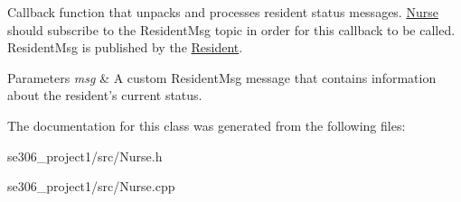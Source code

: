Callback function that unpacks and processes resident status messages. \hyperlink{classNurse}{Nurse} should subscribe to the Resident\-Msg topic in order for this callback to be called. Resident\-Msg is published by the \hyperlink{classResident}{Resident}. 


\begin{DoxyParams}{Parameters}
{\em msg} & A custom Resident\-Msg message that contains information about the resident's current status. \\
\hline
\end{DoxyParams}


The documentation for this class was generated from the following files\-:\begin{DoxyCompactItemize}
\item 
se306\-\_\-project1/src/Nurse.\-h\item 
se306\-\_\-project1/src/Nurse.\-cpp\end{DoxyCompactItemize}

